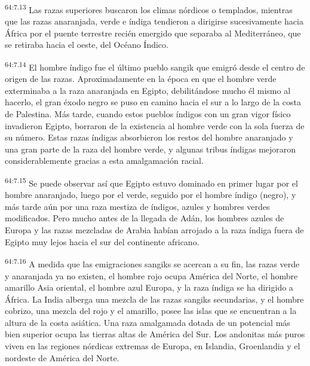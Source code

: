 \par
\textsuperscript{64:7.13} Las razas superiores buscaron los climas nórdicos o templados, mientras que las razas anaranjada, verde e índiga tendieron a dirigirse sucesivamente hacia África por el puente terrestre recién emergido que separaba al Mediterráneo, que se retiraba hacia el oeste, del Océano Índico.

\par
\textsuperscript{64:7.14} El hombre índigo fue el último pueblo sangik que emigró desde el centro de origen de las razas. Aproximadamente en la época en que el hombre verde exterminaba a la raza anaranjada en Egipto, debilitándose mucho él mismo al hacerlo, el gran éxodo negro se puso en camino hacia el sur a lo largo de la costa de Palestina. Más tarde, cuando estos pueblos índigos con un gran vigor físico invadieron Egipto, borraron de la existencia al hombre verde con la sola fuerza de su número. Estas razas índigas absorbieron los restos del hombre anaranjado y una gran parte de la raza del hombre verde, y algunas tribus índigas mejoraron considerablemente gracias a esta amalgamación racial.

\par
\textsuperscript{64:7.15} Se puede observar así que Egipto estuvo dominado en primer lugar por el hombre anaranjado, luego por el verde, seguido por el hombre índigo (negro), y más tarde aún por una raza mestiza de índigos, azules y hombres verdes modificados. Pero mucho antes de la llegada de Adán, los hombres azules de Europa y las razas mezcladas de Arabia habían arrojado a la raza índiga fuera de Egipto muy lejos hacia el sur del continente africano.

\par
\textsuperscript{64:7.16} A medida que las emigraciones sangiks se acercan a su fin, las razas verde y anaranjada ya no existen, el hombre rojo ocupa América del Norte, el hombre amarillo Asia oriental, el hombre azul Europa, y la raza índiga se ha dirigido a África. La India alberga una mezcla de las razas sangiks secundarias, y el hombre cobrizo, una mezcla del rojo y el amarillo, posee las islas que se encuentran a la altura de la costa asiática. Una raza amalgamada dotada de un potencial más bien superior ocupa las tierras altas de América del Sur. Los andonitas más puros viven en las regiones nórdicas extremas de Europa, en Islandia, Groenlandia y el nordeste de América del Norte.

